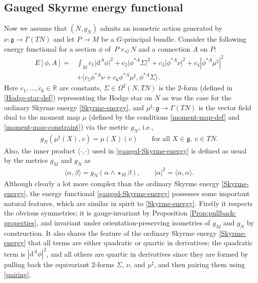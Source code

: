 \documentclass[pdftex]{sigma}
\newcommand{\g}{{\mathfrak{g}}}
\newcommand{\R}{{\mathbb{R}}}
\newcommand{\1}{{\mathbb{1}}}
\def \d{\mathrm{d}}
\newcommand{\ip}[1]{\langle#1\rangle}
\numberwithin{equation}{section}
\begin{document}
\subsection{Gauged Skyrme energy functional}\label{sec:energy-gauged}
Now we assume that $(N,g_N)$ admits an isometric action generated by $\nu\colon \g\to \Gamma(TN)$ and let $P\to M$ be a $G$-principal bundle. Consider the following energy functional for a section $\phi$ of~$P\times_GN$ and a connection $A$ on $P$:
\begin{align} E[\phi,A]=&\int_Mc_1\bigl|\d^A\phi\bigr|^2+c_2\bigl|\phi^{\ast A}\Sigma\bigr|^2+c_3\bigl|\phi^{\ast A}\nu\bigr|^2+c_4|\phi^{\ast A}\mu^\sharp|^2\nonumber\\
&+\bigl\langle c_5\phi^{\ast A}\nu+c_6\phi^{\ast A}\mu^\sharp,\phi^{\ast A}\Sigma\bigr\rangle.\label{gauged-Skyrme-energy}
\end{align}
Here $c_1,\dots,c_6\in\R$ are constants, $\Sigma\in\Omega^2(N,TN)$ is the $2$-form (defined in \eqref{Hodge-star-def}) representing the Hodge star on $N$ as was the case for the ordinary Skyrme energy \eqref{Skyrme-energy}, and $\mu^\sharp\colon \g\to\Gamma(TN)$ is the vector field dual to the moment map $\mu$ (defined by the conditions \eqref{moment-map-def} and \eqref{moment-map-constraint}) via the metric $g_N$, i.e.,
\begin{align*}
 g_N(\mu^\sharp(X),v)=\mu(X)(v)\qquad\text{for all }X\in\g,\ v\in TN.
\end{align*}
Also, the inner product $\ip{\cdot,\cdot}$ used in \eqref{gauged-Skyrme-energy} is defined as usual by the metrics $g_M$ and $g_N$ as
\begin{align}
 \ip{\alpha,\beta}=g_N(\alpha\wedge\star_{M}\beta),\qquad|\alpha|^2=\ip{\alpha,\alpha}.\label{pairing}
\end{align}
Although clearly a lot more complex than the ordinary Skyrme energy \eqref{Skyrme-energy}, the energy functional \eqref{gauged-Skyrme-energy} possesses some important natural features, which are similar in spirit to \eqref{Skyrme-energy}. Firstly it respects the obvious symmetries; it is gauge-invariant by Proposition \ref{Prop:pullback-properties}, and invariant under orientation-preserving isometries of $g_M$ and $g_N$ by construction. It also shares the feature of the ordinary Skyrme energy \eqref{Skyrme-energy} that all terms are either quadratic or quartic in derivatives; the quadratic term is $|\d^A\phi|^2$, and all others are quartic in derivatives since they are formed by pulling back the equivariant $2$-forms $\Sigma$, $\nu$, and $\mu^\sharp$, and then pairing them using \eqref{pairing}.
\end{document}
